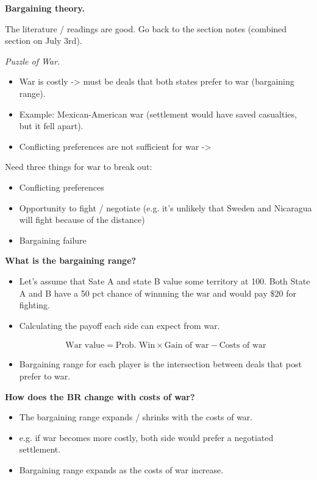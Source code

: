 \documentclass{article}
\begin{document}
{\bf Bargaining theory.}

The literature / readings are good.  Go back to the section notes (combined section on July 3rd).

{\it Puzzle of War.}

\begin{itemize}
  \item War is costly -> must be deals that both states prefer to war (bargaining range).
  \item Example: Mexican-American war (settlement would have saved casualties, but it fell apart).
  \item Conflicting preferences are not sufficient for war ->
\end{itemize}

Need three things for war to break out:
\begin{itemize}
  \item Conflicting preferences
  \item Opportunity to fight / negotiate (e.g. it's unlikely that Sweden and Nicaragua will fight because of the distance)
  \item Bargaining failure
\end{itemize}

{\bf What is the bargaining range?}

\begin{itemize}
  \item Let's assume that Sate A and state B value some territory at 100.  Both State A and B have a 50 pct chance of winnning the war and would pay $\$ 20$ for fighting.
  \item Calculating the payoff each side can expect from war.

    \begin{align*}
      \text{War value} = \text{Prob. Win} \times \text{Gain of war} - \text{Costs of war}
    \end{align*}

  \item  Bargaining range for each player is the intersection between deals that post prefer to war.
\end{itemize}

{\bf How does the BR change with costs of war?}

\begin{itemize}
  \item The bargaining range expands / shrinks with the costs of war.
  \item e.g. if war becomes more costly, both side would prefer a negotiated settlement.
  \item Bargaining range expands as the costs of war increase.
\end{itemize}
\end{document}
